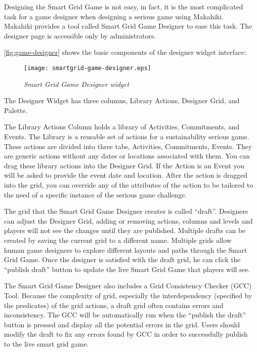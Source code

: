 Designing the Smart Grid Game is not easy, in fact, it is the most complicated task for a game designer when designing a serious game using Makahiki. Makahiki provides a tool called Smart Grid Game Designer to ease this task. The designer page is accessible only by administrators. 

\autoref{fig:game-designer} shows the basic components of the designer widget interface:

\begin{figure}[!ht]
  \center
  \texttt{[image: smartgrid-game-designer.eps]}
  \caption{\em Smart Grid Game Designer widget}
  \label{fig:game-designer}
\end{figure}

The Designer Widget has three columns, Library Actions, Designer Grid, and Palette. 

The Library Actions Column holds a library of Activities, Commitments, and Events. The Library is a reusable set of actions for a sustainability serious game. These actions are divided into three tabs, Activities, Commitments, Events. They are generic actions without any dates or locations associated with them. You can drag these library actions into the Designer Grid. If the Action is an Event you will be asked to provide the event date and location. After the action is dragged into the grid, you can override any of the attributes of the action to be tailored to the need of a specific instance of the serious game challenge.
 
The grid that the Smart Grid Game Designer creates is called ``draft''. Designers can adjust the Designer Grid, adding or removing actions, columns and levels and players will not see the changes until they are published. Multiple drafts can be created by saving the current grid to a different name. Multiple grids allow human game designers to explore different layouts and paths through the Smart Grid Game. Once the designer is satisfied with the draft grid, he can click the ``publish draft'' button to update the live Smart Grid Game that players will see.

The Smart Grid Game Designer also includes a Grid Consistency Checker (GCC) Tool. Because the complexity of grid, especially the interdependency (specified by the predicates) of the grid actions, a draft grid often contains errors and inconsistency. The GCC will be automatically run when the ``publish the draft'' button is pressed and display all the potential errors in the grid. Users should modify the draft to fix any errors found by GCC in order to successfully publish to the live smart grid game. 

